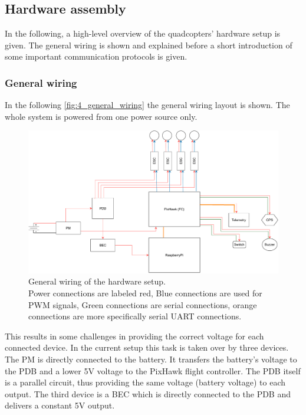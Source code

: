 \subsection{Hardware assembly}\label{subsec:4_hw_setup}
In the following, a high-level overview of the quadcopters' hardware setup is 
given.
The general wiring is shown and explained before a short introduction of some 
important communication protocols is given.

\subsubsection{General wiring}
In the following \autoref{fig:4_general_wiring} the general wiring layout is 
shown.
The whole system is powered from one power source only.
\begin{figure}[!h]
    \centering
    \includegraphics[scale=0.5]{general_wiring.pdf}
    \caption[General Wiring]{General wiring of the hardware setup.\\
    Power connections are labeled red, 
    Blue connections are used for \ac{PWM} signals, 
    Green connections are serial connections, 
    orange connections are more specifically serial UART connections.}
    \label{fig:4_general_wiring}
\end{figure}
\FloatBarrier
\noindent This results in some challenges in providing the correct voltage for
each connected device.
In the current setup this task is taken over by three devices.
The \ac{PM} is directly connected to the battery.
It transfers the battery's voltage to the \ac{PDB} and a lower 5V voltage to
the PixHawk flight controller.
The \ac{PDB} itself is a parallel circuit, thus providing the same voltage
(battery voltage) to each output.
The third device is a \ac{BEC} which is directly connected
to the \ac{PDB} and delivers a constant 5V output.
